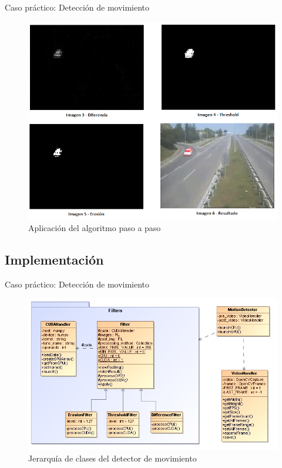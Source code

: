 \documentclass{beamer}
\begin{document}
\begin{frame}{Caso práctico: Detección de movimiento}
  \begin{figure}
    \begin{center}
      \includegraphics[width=.6\textwidth]{filters_step_by_step.png}
      \caption{Aplicación del algoritmo paso a paso}
    \end{center}
  \end{figure}
\end{frame}

\subsection{Implementación}

\begin{frame}{Caso práctico: Detección de movimiento}
  \begin{figure}
    \begin{center}
      \includegraphics[width=.8\textwidth]{UMLnew.png}
      \caption{Jerarquía de clases del detector de movimiento}
    \end{center}
  \end{figure}
\end{frame}
\end{document}
